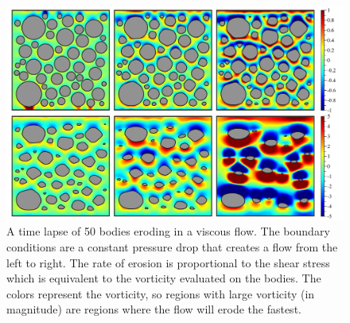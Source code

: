 \documentclass[preprint, 10pt]{elsarticle}
\begin{document}
\begin{figure}%
\begin{center}
\includegraphics[width = 0.9 \textwidth]{./figs/50bod.pdf}
\caption{\label{fig:50bodies} A time lapse of 50 bodies eroding in a
viscous flow.  The boundary conditions are a constant pressure drop that
creates a flow from the left to right.  The rate of erosion is
proportional to the shear stress which is equivalent to the vorticity
evaluated on the bodies.  The colors represent the vorticity, so regions
with large vorticity (in magnitude) are regions where the flow will
erode the fastest.}
\end{center}
\end{figure}


\end{document}
